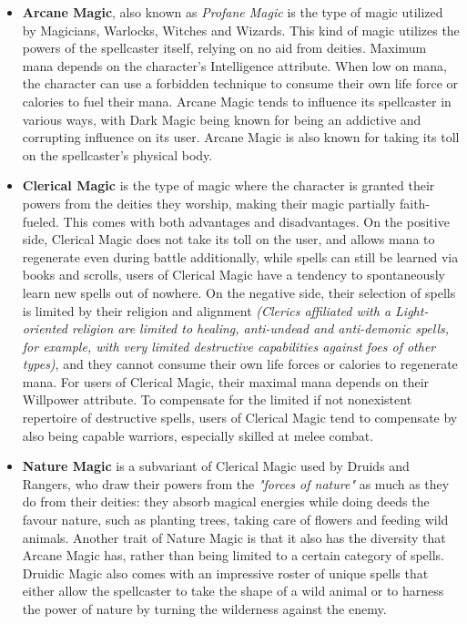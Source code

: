 \documentclass[tikz,openany,11pt,a4paper]{book}
\begin{document}
\begin{itemize}
\item \textbf{Arcane Magic}, also known as \textit{Profane Magic} is the type of magic utilized by Magicians, Warlocks, Witches and Wizards. This kind of magic utilizes the powers of the spellcaster itself, relying on no aid from deities. Maximum mana depends on the character's Intelligence attribute. When low on mana, the character can use a forbidden technique to consume their own life force or calories to fuel their mana. Arcane Magic tends to influence its spellcaster in various ways, with Dark Magic being known for being an addictive and corrupting influence on its user. Arcane Magic is also known for taking its toll on the spellcaster's physical body.
\item \textbf{Clerical Magic} is the type of magic where the character is granted their powers from the deities they worship, making their magic partially faith-fueled. This comes with both advantages and disadvantages. On the positive side, Clerical Magic does not take its toll on the user, and allows mana to regenerate even during battle \textemdash additionally, while spells can still be learned via books and scrolls, users of Clerical Magic have a tendency to spontaneously learn new spells out of nowhere. On the negative side, their selection of spells is limited by their religion and alignment \textit{(Clerics affiliated with a Light-oriented religion are limited to healing, anti-undead and anti-demonic spells, for example, with very limited destructive capabilities against foes of other types)}, and they cannot consume their own life forces or calories to regenerate mana. For users of Clerical Magic, their maximal mana depends on their Willpower attribute. To compensate for the limited \textemdash if not nonexistent \textemdash repertoire of destructive spells, users of Clerical Magic tend to compensate by also being capable warriors, especially skilled at melee combat. 
\item \textbf{Nature Magic} is a subvariant of Clerical Magic used by Druids and Rangers, who draw their powers from the \textit{"forces of nature"} as much as they do from their deities: they absorb magical energies while doing deeds the favour nature, such as planting trees, taking care of flowers and feeding wild animals. Another trait of Nature Magic is that it also has the diversity that Arcane Magic has, rather than being limited to a certain category of spells. Druidic Magic also comes with an impressive roster of unique spells that either allow the spellcaster to take the shape of a wild animal or to harness the power of nature by turning the wilderness against the enemy.
\end{itemize}
\end{document}
